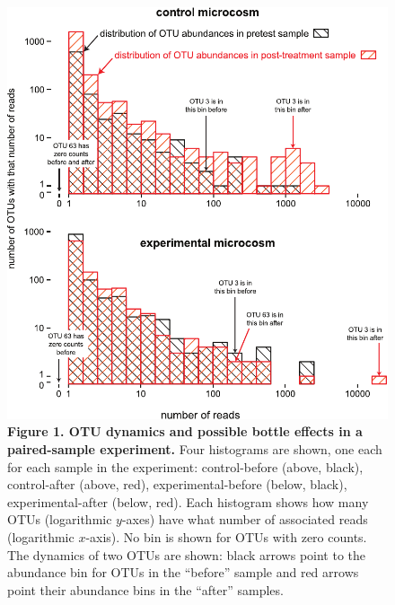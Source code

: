 \clearpage
\begin{figure}[ht]
\centering
\includegraphics{texmex/fig/fig_1}
\caption*{{\bf Figure 1. OTU dynamics and possible bottle effects in a paired-sample experiment.} 
Four histograms are shown, one each for each sample in the experiment:
control-before (above, black), control-after (above, red), experimental-before
(below, black), experimental-after (below, red). Each histogram shows how many
OTUs (logarithmic $y$-axes) have what number of associated reads (logarithmic
$x$-axis). No bin is shown for OTUs with zero counts. The dynamics of two OTUs
are shown: black arrows point to the abundance bin for OTUs in the ``before''
sample and red arrows point their abundance bins in the ``after'' samples.}
\end{figure}

